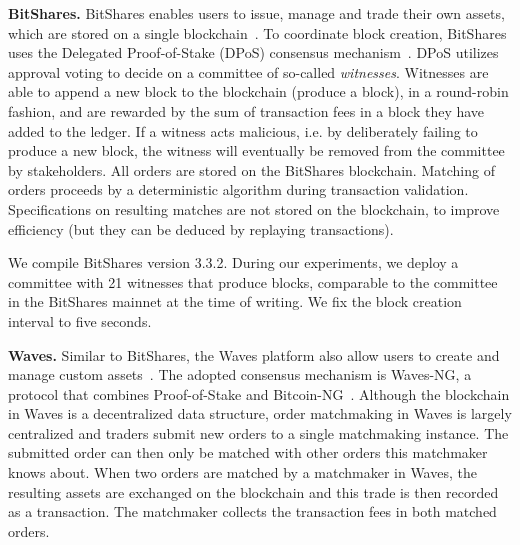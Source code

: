 \textbf{BitShares.}
BitShares enables users to issue, manage and trade their own assets, which are stored on a single blockchain~\cite{schuh2015bitshares}.
To coordinate block creation, BitShares uses the Delegated Proof-of-Stake (DPoS) consensus mechanism~\cite{larimer2014delegated}.
DPoS utilizes approval voting to decide on a committee of so-called \emph{witnesses}.
Witnesses are able to append a new block to the blockchain (produce a block), in a round-robin fashion, and are rewarded by the sum of transaction fees in a block they have added to the ledger.
If a witness acts malicious, i.e. by deliberately failing to produce a new block, the witness will eventually be removed from the committee by stakeholders.
All orders are stored on the BitShares blockchain.
Matching of orders proceeds by a deterministic algorithm during transaction validation.
Specifications on resulting matches are not stored on the blockchain, to improve efficiency (but they can be deduced by replaying transactions).

We compile BitShares version 3.3.2.
During our experiments, we deploy a committee with 21 witnesses that produce blocks, comparable to the committee in the BitShares mainnet at the time of writing.
We fix the block creation interval to five seconds.

\textbf{Waves.}
Similar to BitShares, the Waves platform also allow users to create and manage custom assets~\cite{wavesplatform}.
The adopted consensus mechanism is Waves-NG, a protocol that combines Proof-of-Stake and Bitcoin-NG~\cite{eyal2016bitcoin}.
Although the blockchain in Waves is a decentralized data structure, order matchmaking in Waves is largely centralized and traders submit new orders to a single matchmaking instance.
The submitted order can then only be matched with other orders this matchmaker knows about.
When two orders are matched by a matchmaker in Waves, the resulting assets are exchanged on the blockchain and this trade is then recorded as a transaction.
The matchmaker collects the transaction fees in both matched orders.

